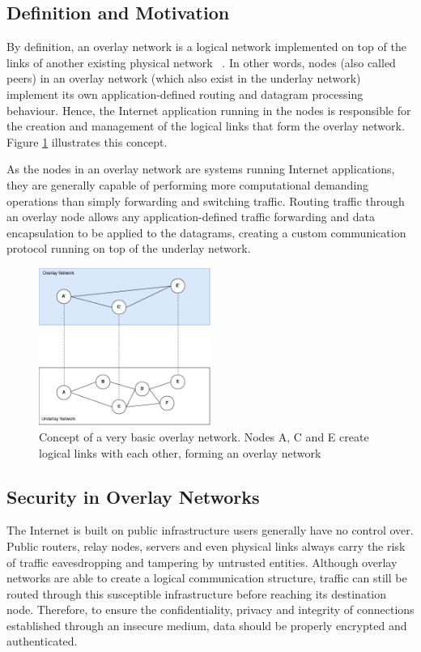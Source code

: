 \documentclass[11pt,twoside,a4paper]{report}
\begin{document}
\subsection{Definition and Motivation}

By definition, an overlay network is a logical network implemented on top of the links of another existing physical network ~\cite{livronet}. In other words, nodes (also called peers) in an overlay network (which also exist in the underlay network) implement its own application-defined routing and datagram processing behaviour. Hence, the Internet application running in the nodes is responsible for the creation and management of the logical links that form the overlay network. Figure \ref{fig:overlay} illustrates this concept.

As the nodes in an overlay network are systems running Internet applications, they are generally capable of performing more computational demanding operations than simply forwarding and switching traffic. Routing traffic through an overlay node allows any application-defined traffic forwarding and data encapsulation to be applied to the datagrams, creating a custom communication protocol running on top of the underlay network.

\begin{figure}[h]
\centering
\includegraphics[width=0.5\textwidth]{overlays.png}
\caption{Concept of a very basic overlay network. Nodes A, C and E create logical links with each other, forming an overlay network}
\label{fig:overlay}
\end{figure}

\subsection{Security in Overlay Networks}

The Internet is built on public infrastructure users generally have no control over. Public routers, relay nodes, servers and even physical links always carry the risk of traffic eavesdropping and tampering by untrusted entities. Although overlay networks are able to create a logical communication structure, traffic can still be routed through this susceptible infrastructure before reaching its destination node. Therefore, to ensure the confidentiality, privacy and integrity of connections established through an insecure medium, data should be properly encrypted and authenticated.
\end{document}
